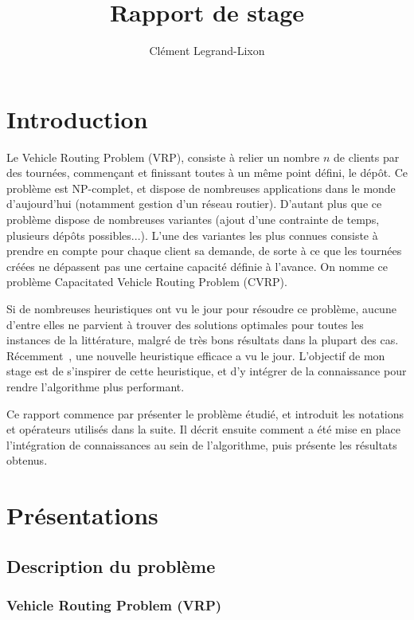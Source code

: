 \documentclass[a4paper,11pt]{article}%
\begin{document}
\title{Rapport de stage}

\author{Clément Legrand-Lixon}

\maketitle


\section*{Introduction}
Le Vehicle Routing Problem (VRP), consiste à relier un nombre $n$ de clients par des tournées, commençant et finissant toutes à un même point défini, le dépôt. Ce problème est NP-complet, et dispose de nombreuses applications dans le monde d'aujourd'hui (notamment gestion d'un réseau routier). D'autant plus que ce problème dispose de nombreuses variantes (ajout d'une contrainte de temps, plusieurs dépôts possibles...). L'une des variantes les plus connues consiste à prendre en compte pour chaque client sa demande, de sorte à ce que les tournées créées ne dépassent pas une certaine capacité définie à l'avance. On nomme ce problème Capacitated Vehicle Routing Problem (CVRP). 

Si de nombreuses heuristiques ont vu le jour pour résoudre ce problème, aucune d'entre elles ne parvient à trouver des solutions optimales pour toutes les instances de la littérature, malgré de très bons résultats dans la plupart des cas. Récemment~\cite{Sorensen_2017}, une nouvelle heuristique efficace a vu le jour. L'objectif de mon stage est de s'inspirer de cette heuristique, et d'y intégrer de la connaissance pour rendre l'algorithme plus performant.

Ce rapport commence par présenter le problème étudié, et introduit les notations et opérateurs utilisés dans la suite. Il décrit ensuite comment a été mise en place l'intégration de connaissances au sein de l'algorithme, puis présente les résultats obtenus.   

\section{Présentations}

\subsection{Description du problème}

\subsubsection{Vehicle Routing Problem (VRP)}
\end{document}
